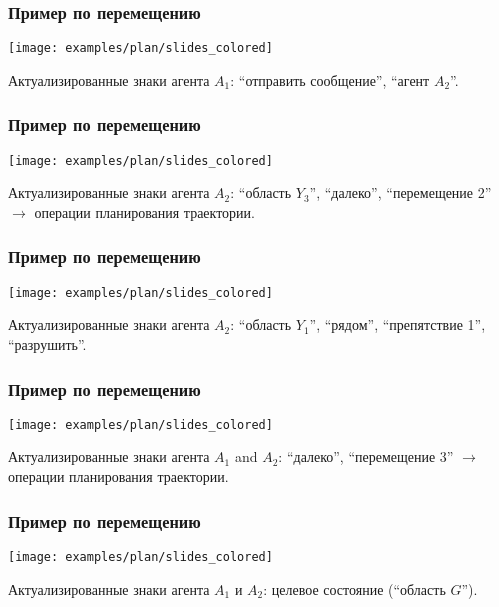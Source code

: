 \documentclass[default]{beamer}
\begin{document}
	\begin{frame}
		\frametitle{Пример по перемещению}
	
		\begin{center}
		\texttt{[image: examples/plan/slides\_colored]}
		\end{center}
		\par\bigskip
		Актуализированные знаки агента $A_1$: ``отправить сообщение'', ``агент $A_2$''.
	\end{frame}
	
	\begin{frame}
		\frametitle{Пример по перемещению}
		
		\begin{center}
		\texttt{[image: examples/plan/slides\_colored]}
		\end{center}
		\par\bigskip
		Актуализированные знаки агента $A_2$: ``область $Y_3$'', ``далеко'', ``перемещение 2'' $\rightarrow$ \color{green!70!black} операции планирования траектории.
	\end{frame}
	
	\begin{frame}
		\frametitle{Пример по перемещению}
		
		\begin{center}
		\texttt{[image: examples/plan/slides\_colored]}
		\end{center}
		\par\bigskip
		Актуализированные знаки агента $A_2$: ``область $Y_1$'', ``рядом'', ``препятствие 1'', ``разрушить''.
	\end{frame}
	
	\begin{frame}
		\frametitle{Пример по перемещению}
		
		\begin{center}
		\texttt{[image: examples/plan/slides\_colored]}
		\end{center}
		\par\bigskip
		Актуализированные знаки агента $A_1$ and $A_2$: ``далеко'', ``перемещение 3'' $\rightarrow$ \color{green!70!black} операции планирования траектории.
	\end{frame}
	
	\begin{frame}
		\frametitle{Пример по перемещению}
		
		\begin{center}
		\texttt{[image: examples/plan/slides\_colored]}
		\end{center}
		\par\bigskip
		Актуализированные знаки агента $A_1$ и $A_2$: целевое состояние (``область $G$'').
	\end{frame}
\end{document}
